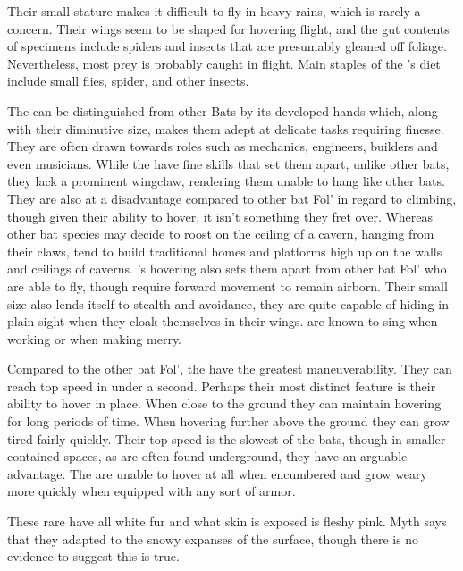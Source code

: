 \documentclass[twoside, 12pt, letterpaper]{report}\usepackage[]{graphicx}\usepackage[]{color}
\begin{document}
\begin{multicols*}{2}
Their small stature makes it difficult to fly in heavy rains, which is rarely a concern. Their wings seem to be shaped for hovering flight, and the gut contents of specimens include spiders and insects that are presumably gleaned off foliage. Nevertheless, most prey is probably caught in flight. Main staples of the \hnbat's diet include small flies, spider, and other insects.

The \hnbat can be distinguished from other Bats by its developed hands which, along with their diminutive size, makes them adept at delicate tasks requiring finesse. They are often drawn towards roles such as mechanics, engineers, builders and even musicians. While the \hnbat have fine skills that set them apart, unlike other bats, they lack a prominent wingclaw, rendering them unable to hang like other bats. They are also at a disadvantage compared to other bat Fol' in regard to climbing, though given their ability to hover, it isn't something they fret over. Whereas other bat species may decide to roost on the ceiling of a cavern, hanging from their claws, \hnbat tend to build traditional homes and platforms high up on the walls and ceilings of caverns. \hnbat's hovering also sets them apart from other bat Fol' who are able to fly, though require forward movement to remain airborn. Their small size also lends itself to stealth and avoidance, they are quite capable of hiding in plain sight when they cloak themselves in their wings. \hnbat are known to sing when working or when making merry.

Compared to the other bat Fol', the \hnbat have the greatest maneuverability. They can reach top speed in under a second. Perhaps their most distinct feature is their ability to hover in place. When close to the ground they can maintain hovering for long periods of time. When hovering further above the ground they can grow tired fairly quickly. Their top speed is the slowest of the bats, though in smaller contained spaces, as are often found underground, they have an arguable advantage. The \hnbat are unable to hover at all when encumbered and grow weary more quickly when equipped with any sort of armor.

These rare \hnbat have all white fur and what skin is exposed is fleshy pink. Myth says that they adapted to the snowy expanses of the surface, though there is no evidence to suggest this is true. 


\end{multicols*}
\end{document}

